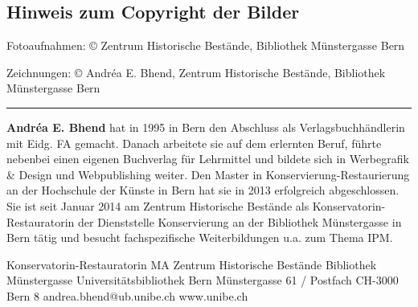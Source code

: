 \documentclass[a4paper,
fontsize=11pt,
oneside,
numbers=noperiodatend,
parskip=half-,
bibliography=totoc,
final
]{scrartcl}
\begin{document}
\hypertarget{hinweis-zum-copyright-der-bilder}{%
\subsection{Hinweis zum Copyright der
Bilder}\label{hinweis-zum-copyright-der-bilder}}

Fotoaufnahmen: © Zentrum Historische Bestände, Bibliothek Münstergasse
Bern

Zeichnungen: © Andréa E. Bhend, Zentrum Historische Bestände, Bibliothek
Münstergasse Bern

\begin{center}\rule{0.5\linewidth}{0.5pt}\end{center}

\textbf{Andréa E. Bhend} hat in 1995 in Bern den Abschluss als
Verlagsbuchhändlerin mit Eidg. FA gemacht. Danach arbeitete sie auf dem
erlernten Beruf, führte nebenbei einen eigenen Buchverlag für Lehrmittel
und bildete sich in Werbegrafik \& Design und Webpublishing weiter. Den
Master in Konservierung-Restaurierung an der Hochschule der Künste in
Bern hat sie in 2013 erfolgreich abgeschlossen. Sie ist seit Januar 2014
am Zentrum Historische Bestände als Konservatorin-Restauratorin der
Dienststelle Konservierung an der Bibliothek Münstergasse in Bern tätig
und besucht fachspezifische Weiterbildungen u.a. zum Thema IPM.

Konservatorin-Restauratorin MA
Zentrum Historische Bestände 
Bibliothek Münstergasse
Universitätsbibliothek Bern
Münstergasse 61 / Postfach
CH-3000 Bern 8
andrea.bhend@ub.unibe.ch
www.unibe.ch
\end{document}
